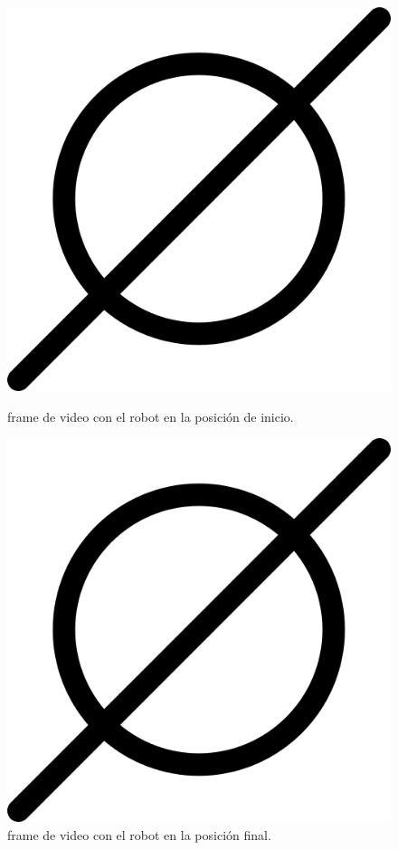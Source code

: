 \begin{figure}[htbp]
  \centering
  \begin{minipage}[b]{0.45\textwidth}
    \centering
    \includegraphics[width=\textwidth]{images/poner_foto.png}
    \caption{frame de video con el robot en la posición de inicio.}
    \label{fig:frame1_nav_largo}
  \end{minipage}
  \hfill
  \begin{minipage}[b]{0.45\textwidth}
    \centering
    \includegraphics[width=\textwidth]{images/poner_foto.png}
    \caption{frame de video con el robot en la posición final.}
    \label{fig:frame2_nav_largo}
  \end{minipage}
\end{figure}

